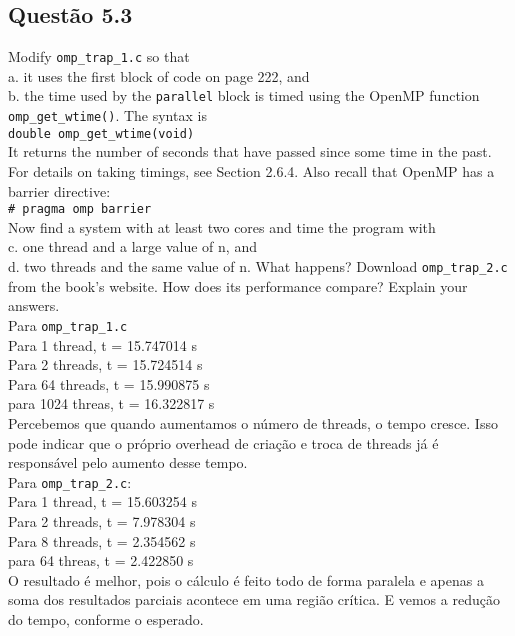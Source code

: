 
\subsection{Questão 5.3}

Modify \texttt{omp\_trap\_1.c} so that \\
a. it uses the first block of code on page 222, and\\
b. the time used by the \texttt{parallel} block is timed using the OpenMP function \texttt{omp\_get\_wtime()}. The syntax is \\
\texttt{double omp\_get\_wtime(void)}\\
It returns the number of seconds that have passed since some time in
the past. For details on taking timings, see Section 2.6.4. Also recall that OpenMP has a barrier directive: \\
\texttt{\# pragma omp barrier}\\
Now find a system with at least two cores and time the program with \\
c. one thread and a large value of n, and\\
d. two threads and the same value of n.
What happens? Download \texttt{omp\_trap\_2.c} from the book’s website. How does its performance compare? Explain your answers. \\

Para \texttt{omp\_trap\_1.c} \\
Para 1 thread, t = 15.747014 s\\
Para 2 threads, t = 15.724514 s\\
Para 64 threads, t = 15.990875 s\\
para 1024 threas, t = 16.322817 s\\

Percebemos que quando aumentamos o número de threads, o tempo cresce. Isso pode indicar que o próprio overhead de criação e troca de threads já é responsável pelo aumento desse tempo. \\

Para \texttt{omp\_trap\_2.c}: \\
Para 1 thread, t = 15.603254 s\\
Para 2 threads, t = 7.978304 s\\
Para 8 threads, t = 2.354562 s\\
para 64 threas, t = 2.422850 s\\

O resultado é melhor, pois o cálculo é feito todo de forma paralela e apenas a soma dos resultados parciais acontece em uma região crítica. E vemos a redução do tempo, conforme o esperado.



